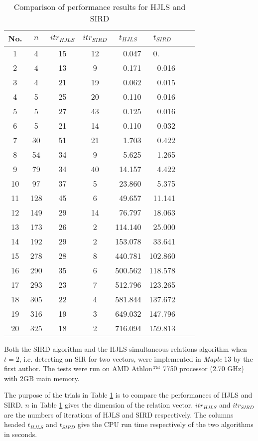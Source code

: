 \documentclass{sig-alternate}
\numberwithin{theorem}{section} \numberwithin{equation}{section}
\begin{document}
\begin{table}[H]\centering
\begin{tabular}{||c|c|c|c|c|c|c|c|}
  \hline
No.&  $n$  & $itr_{HJLS}$ & $itr_{SIRD}$ & $t_{HJLS}$ & $t_{SIRD}$
 \\\hline\hline
  1&4&15&12&\ \ 0.047&0.\ \ \  \\
 2&4&13&9&\ \ 0.171&\ \ 0.016\\
 3&4&21&19&\ \ 0.062&\ \ 0.015\\
 4&5&25&20&\ \ 0.110&\ \ 0.016\\
 5&5&27&43&\ \ 0.125&\ \ 0.016\\
 6& 5 &   21 & 14 & \ \ 0.110 & \ \ 0.032 \\\hline
7& 30 &  51 & 21 & \ \ 1.703 & \ \ 0.422 \\
  8&54 & 34 & 9 & \ \ 5.625 & \ \ 1.265 \\
   9&79  & 34 & 40 & \ 14.157 & \ \ 4.422 \\
  10&97 &  37 & 5 & \ 23.860 & \ \ 5.375 \\
  11&128 &  45 & 6 & \ 49.657 & \ 11.141 \\
  12&149 &   29 & 14 & \ 76.797 & \ 18.063 \\
   13&173 & 26 & 2 & 114.140 & \ 25.000 \\
  14&192 &  29 & 2 & 153.078 & \ 33.641 \\
  15&278& 28 & 8 & 440.781 & 102.860  \\
   16&290 & 35 & 6 & 500.562 & 118.578  \\
   17&293 & 23 & 7 & 512.796 & 123.265  \\
   18&305 & 22 & 4 & 581.844 & 137.672  \\
   19&316 & 19 & 3 & 649.032 & 147.796  \\
  20&325 & 18 & 2 & 716.094 & 159.813  \\
  \hline
\end{tabular}\caption{Comparison of performance results for HJLS and SIRD }\label{tab:performance-of-SIRD}
\end{table}

 Both the SIRD algorithm and the HJLS simultaneous relations
algorithm when $t=2$, i.e. detecting an SIR for two vectors, were
implemented in \emph{Maple} 13 by the first author.  The tests were
run on AMD Athlon$^{\tiny\mbox{TM}}$ 7750 processor (2.70 GHz) with
2GB main memory.

The purpose of the trials in Table \ref{tab:performance-of-SIRD} is
to compare the performances of HJLS and SIRD.  $n$ in Table
\ref{tab:performance-of-SIRD} gives the dimension of the relation
vector. $itr_{HJLS}$ and $itr_{SIRD}$ are the numbers of iterations
of HJLS and SIRD respectively. The columns headed $t_{HJLS}$ and
$t_{SIRD}$ give the CPU run time respectively of the two algorithms
in seconds. 
\end{document}
